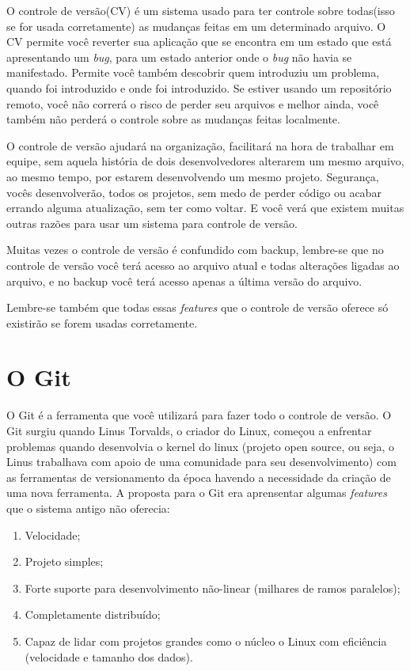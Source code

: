 \documentclass[12pt,openright,oneside,a4paper,english,brazil]{abntex2}
\begin{document}
O controle de versão(CV) é um sistema usado para ter controle sobre todas(isso se for usada corretamente) as mudanças feitas em um determinado arquivo. O CV permite você reverter sua aplicação que se encontra em um estado que está apresentando um \textit{bug}, para um estado anterior onde o \textit{bug} não havia se manifestado. Permite você também descobrir quem introduziu um problema, quando foi introduzido e onde foi introduzido. Se estiver usando um repositório remoto, você não correrá o risco de perder seu arquivos e melhor ainda, você também não perderá o controle sobre as mudanças feitas localmente. 

O controle de versão ajudará na organização, facilitará na hora de trabalhar em equipe, sem aquela história de dois desenvolvedores alterarem um mesmo arquivo, ao mesmo tempo, por estarem desenvolvendo um mesmo projeto. Segurança, vocês desenvolverão, todos os projetos, sem medo de perder código ou acabar errando alguma atualização, sem ter como voltar. E você verá que existem muitas outras razões para usar um sistema para controle de versão.

Muitas vezes o controle de versão é confundido com backup, lembre-se que no controle de versão você terá acesso ao arquivo atual e todas alterações ligadas ao arquivo, e no backup você terá acesso apenas a última versão do arquivo.

Lembre-se também que todas essas \textit{features} que o controle de versão oferece só existirão se forem usadas corretamente.

\section{O Git}

O Git é a ferramenta que você utilizará para fazer todo o controle de versão. O Git surgiu quando Linus Torvalds, o criador do Linux, começou a enfrentar problemas quando desenvolvia o kernel do linux (projeto open source, ou seja, o Linus trabalhava com apoio de uma comunidade para seu desenvolvimento) com as ferramentas de versionamento da época havendo a necessidade da criação de uma nova ferramenta. A proposta para o Git era aprensentar algumas \textit{features} que o sistema antigo não oferecia:

\begin{enumerate}
	\item Velocidade;
	\item Projeto simples;
	\item Forte suporte para desenvolvimento não-linear (milhares de ramos paralelos);
	\item Completamente distribuído;
	\item Capaz de lidar com projetos grandes como o núcleo o Linux com eficiência (velocidade e tamanho dos dados).	
\end{enumerate}
\end{document}
